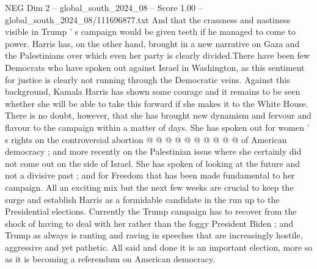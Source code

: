 \begin{textsample}{NEG Dim 2 – global\_south\_2024\_08 – Score 1.00 – global\_south\_2024\_08/111696877.txt}
And that the crassness and nastiness visible in Trump ' s campaign would be given teeth if he managed to come to power.
Harris has, on the other hand, brought in a new narrative on Gaza and the Palestinians over which even her party is clearly divided.There have been few Democrats who have spoken out against Israel in Washington, as this sentiment for justice is clearly not running through the Democratic veins.
Against this background, Kamala Harris has shown some courage and it remains to be seen whether she will be able to take this forward if she makes it to the White House.
There is no doubt, however, that she has brought new dynamism and fervour and flavour to the campaign within a matter of days.
She has spoken out for women ' s rights on the controversial abortion @ @ @ @ @ @ @ @ @ @ of American democracy ; and more recently on the Palestinian issue where she certainly did not come out on the side of Israel.
She has spoken of looking at the future and not a divisive past ; and for Freedom that has been made fundamental to her campaign.
All an exciting mix but the next few weeks are crucial to keep the surge and establish Harris as a formidable candidate in the run up to the Presidential elections.
Currently the Trump campaign has to recover from the shock of having to deal with her rather than the foggy President Biden ; and Trump as always is ranting and raving in speeches that are increasingly hostile, aggressive and yet pathetic.
All said and done it is an important election, more so as it is becoming a referendum on American democracy.

\end{textsample}
